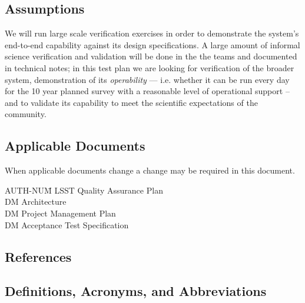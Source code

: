 \subsection{Assumptions}

We will run large scale verification exercises in order to demonstrate the system's end-to-end capability against its design specifications.
A large amount of informal science verification and validation will be done in the the teams and documented in technical notes; in this test plan we are looking for verification of the broader system, demonstration of its \emph{operability} --- i.e. whether it can be run every day for the 10 year planned survey with a reasonable level of operational support --  and to validate its capability to meet the scientific expectations of the community.

\subsection{Applicable Documents \label{sect:ad}}

When applicable documents change a change may be required in this document.
\begin{tabbing}
AUTH-NUM\= \kill
{} \>	LSST Quality  Assurance Plan \\
 \>	DM Architecture\\
 \>	DM Project Management Plan   \\
 \>	DM Acceptance Test Specification \\
\end{tabbing}

\subsection{References}

\renewcommand{\refname}{}


\subsection{Definitions, Acronyms, and Abbreviations \label{sect:acronyms}}
\phantom{ } %

